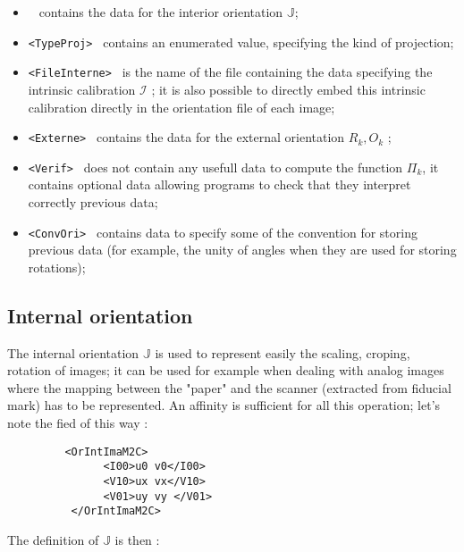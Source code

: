 \begin{itemize}
    \item {\tt <OrIntImaM2C> } contains the data for the interior orientation $\mathbb{J}$;
    \item {\tt <TypeProj> } contains an enumerated value, specifying the kind of projection;
    \item {\tt <FileInterne> } is the name of the file containing the data specifying the
          intrinsic calibration  $  \mathcal{I}$ ; it is also possible to directly embed
          this intrinsic calibration directly in the orientation file of each image;
    \item {\tt <Externe> } contains the data for the external orientation $R_k,O_k$ ;

     \item {\tt  <Verif> } does not contain any usefull data to compute the function $\Pi_k$,
           it contains optional data allowing programs to check that they interpret
           correctly previous data;

     \item {\tt  <ConvOri> } contains data to specify some of the convention for storing
           previous data (for example, the unity of angles when they are used for
           storing rotations);

\end{itemize}


\subsection{Internal orientation}
\label{Image:Int:Ori}

The internal orientation  $\mathbb{J}$ is used to represent easily the scaling,
croping, rotation of images; it can be used for example when dealing with
analog images where the mapping between the "paper" and the scanner (extracted
from fiducial mark) has to be represented. An affinity is sufficient for
all this operation;  let's note the fied of {\tt <OrIntImaM2C>} this way :

\begin{verbatim}
         <OrIntImaM2C>
               <I00>u0 v0</I00>
               <V10>ux vx</V10>
               <V01>uy vy </V01>
          </OrIntImaM2C>
\end{verbatim}

The definition of  $\mathbb{J}$ is then :

